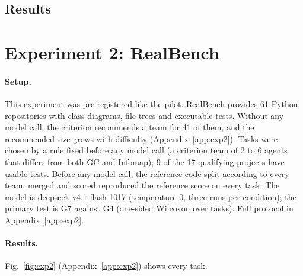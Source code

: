 \subsection{Results}


\section{Experiment 2: RealBench}
\label{sec:exp2}

\paragraph{Setup.} This experiment was pre-registered like the pilot. RealBench \citep{li2026realbench} provides 61 Python repositories with class diagrams, file trees and executable tests. Without any model call, the criterion recommends a team for 41 of them, and the recommended size grows with difficulty (Appendix~\ref{app:exp2}). Tasks were chosen by a rule fixed before any model call (a criterion team of 2 to 6 agents that differs from both GC and Infomap); 9 of the 17 qualifying projects have usable tests. Before any model call, the reference code split according to every team, merged and scored reproduced the reference score on every task. The model is deepseek-v4.1-flash-1017 (temperature 0, three runs per condition); the primary test is G7 against G4 (one-sided Wilcoxon over tasks). Full protocol in Appendix~\ref{app:exp2}.

\paragraph{Results.} \ExpTwoResults{} Fig.~\ref{fig:exp2} (Appendix~\ref{app:exp2}) shows every task.

\ExpTwoBShort

\begin{table}[t]
\centering
\caption{Experiment 2 on RealBench: mean pass rate over three runs (tests passed divided by tests the reference code passes in the same sandbox), with the number of agents in parentheses; tokens are means per run (Mean row: medians). Model: deepseek-v4.1-flash-1017, temperature 0.}
\label{tab:exp2}
\scriptsize
\setlength{\tabcolsep}{2.5pt}
\resizebox{\columnwidth}{!}{}
\end{table}





